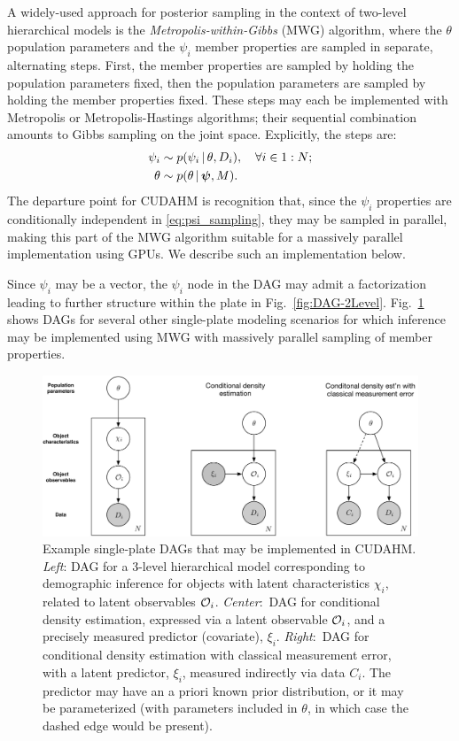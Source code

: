A widely-used approach for posterior sampling in the context of two-level hierarchical models is the \textit{Metropolis-within-Gibbs} (MWG) algorithm, where the $\theta$ population parameters and the $\psi_i$ member properties are sampled in separate, alternating steps.
First, the member properties are sampled by holding the population parameters fixed, then the population parameters are sampled by holding the member properties fixed.
These steps may each be implemented with Metropolis or Metropolis-Hastings algorithms; their sequential combination amounts to Gibbs sampling on the joint space.
Explicitly, the steps are:
\begin{align}
\psi_i &\sim p(\psi_i \,|\, \theta, D_i), \quad\forall i\in 1:N;
\label{eq:psi_sampling} \\
\theta &\sim p(\theta \,|\, \boldsymbol{\psi}, M).
\label{eq:theta_sampling}
\end{align}
The departure point for CUDAHM is recognition that, since the $\psi_i$ properties are conditionally independent in \eqref{eq:psi_sampling}, they may be sampled in parallel, making this part of the MWG algorithm suitable for a massively parallel implementation using GPUs.
We describe such an implementation below.

Since $\psi_i$ may be a vector, the $\psi_i$ node in the DAG may admit a factorization leading to further structure within the plate in Fig.~\ref{fig:DAG-2Level}.
Fig.~\ref{fig:DAGs} shows DAGs for several other single-plate modeling scenarios for which inference may be implemented using MWG with massively parallel sampling of member properties.

\begin{figure}
\begin{center}
\includegraphics[width=.9\textwidth]{fig/DAGs-3}
\end{center}
\caption{Example single-plate DAGs that may be implemented in CUDAHM.
\emph{Left}: DAG for a 3-level hierarchical model corresponding to demographic inference for objects with latent characteristics $\chi_i$, related to latent observables $\mathcal{O}_i$.
\emph{Center}:~DAG for conditional density estimation, expressed via a latent observable $\mathcal{O}_i$, and a precisely measured predictor (covariate), $\xi_i$.
\emph{Right}:~DAG for conditional density estimation with classical measurement error, with a latent predictor, $\xi_i$, measured indirectly via data $C_i$.
The predictor may have an a priori known prior distribution, or it may be parameterized (with parameters included in $\theta$, in which case the dashed edge would be present).}
\label{fig:DAGs}
\end{figure}

